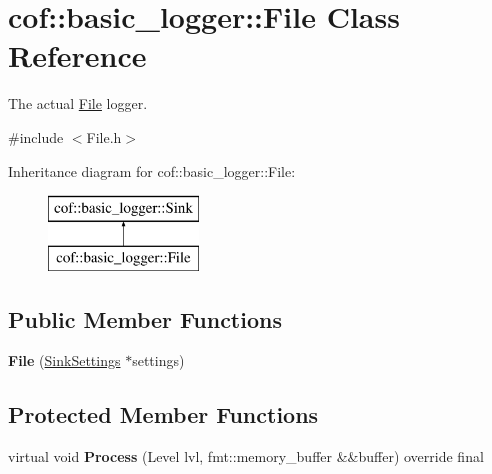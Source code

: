 \hypertarget{classcof_1_1basic__logger_1_1_file}{}\section{cof\+:\+:basic\+\_\+logger\+:\+:File Class Reference}
\label{classcof_1_1basic__logger_1_1_file}


The actual \hyperlink{classcof_1_1basic__logger_1_1_file}{File} logger.  




{\ttfamily \#include $<$File.\+h$>$}

Inheritance diagram for cof\+:\+:basic\+\_\+logger\+:\+:File\+:\begin{figure}[H]
\begin{center}
\leavevmode
\includegraphics[height=2.000000cm]{classcof_1_1basic__logger_1_1_file}
\end{center}
\end{figure}
\subsection*{Public Member Functions}
\begin{DoxyCompactItemize}
\item 
\mbox{\label{classcof_1_1basic__logger_1_1_file_a01bf70f50c3de009072764006194727c}} 
{\bfseries File} (\hyperlink{structcof_1_1basic__logger_1_1_sink_settings}{Sink\+Settings} $\ast$settings)
\end{DoxyCompactItemize}
\subsection*{Protected Member Functions}
\begin{DoxyCompactItemize}
\item 
\mbox{\label{classcof_1_1basic__logger_1_1_file_a057640c6e84ddffd35215dee11e5f6a7}} 
virtual void {\bfseries Process} (Level lvl, fmt\+::memory\+\_\+buffer \&\&buffer) override final
\end{DoxyCompactItemize}
